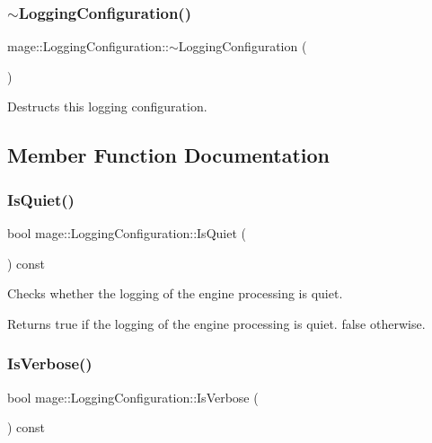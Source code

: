 \subsubsection{\texorpdfstring{$\sim$\+Logging\+Configuration()}{~LoggingConfiguration()}}
{\footnotesize\ttfamily mage\+::\+Logging\+Configuration\+::$\sim$\+Logging\+Configuration (\begin{DoxyParamCaption}{ }\end{DoxyParamCaption})\hspace{0.3cm}{\ttfamily [default]}}

Destructs this logging configuration. 

\subsection{Member Function Documentation}
\hypertarget{structmage_1_1_logging_configuration_a64f7a7b45bc0e896b9d493ddaf13ca82}{}\label{structmage_1_1_logging_configuration_a64f7a7b45bc0e896b9d493ddaf13ca82} 
\subsubsection{\texorpdfstring{Is\+Quiet()}{IsQuiet()}}
{\footnotesize\ttfamily bool mage\+::\+Logging\+Configuration\+::\+Is\+Quiet (\begin{DoxyParamCaption}{ }\end{DoxyParamCaption}) const\hspace{0.3cm}{\ttfamily [noexcept]}}

Checks whether the logging of the engine processing is quiet.

\begin{DoxyReturn}{Returns}
{\ttfamily true} if the logging of the engine processing is quiet. {\ttfamily false} otherwise. 
\end{DoxyReturn}
\hypertarget{structmage_1_1_logging_configuration_a4ad7dc55f8d105c1125adcea4796bb3b}{}\label{structmage_1_1_logging_configuration_a4ad7dc55f8d105c1125adcea4796bb3b} 
\subsubsection{\texorpdfstring{Is\+Verbose()}{IsVerbose()}}
{\footnotesize\ttfamily bool mage\+::\+Logging\+Configuration\+::\+Is\+Verbose (\begin{DoxyParamCaption}{ }\end{DoxyParamCaption}) const\hspace{0.3cm}{\ttfamily [noexcept]}}

